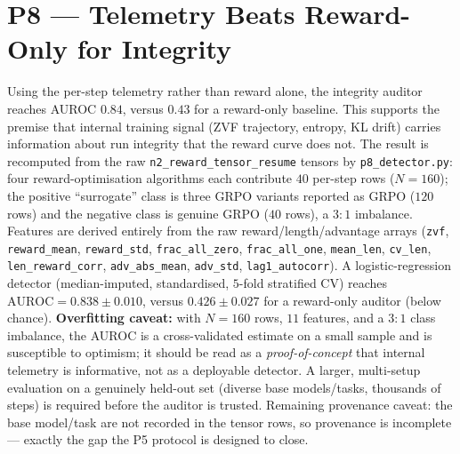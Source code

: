 \documentclass[12pt,a4paper]{report}
\begin{document}
\section{P8 --- Telemetry Beats Reward-Only for Integrity}
Using the per-step telemetry rather than reward alone, the integrity auditor reaches
AUROC $0.84$, versus $0.43$ for a reward-only baseline. This supports the premise
that internal training signal (ZVF trajectory, entropy, KL drift) carries
information about run integrity that the reward curve does not. The result is
recomputed from the raw \texttt{n2\_reward\_tensor\_resume} tensors by
\texttt{p8\_detector.py}: four reward-optimisation algorithms each contribute $40$
per-step rows ($N=160$); the positive ``surrogate'' class is three GRPO variants
reported as GRPO ($120$ rows) and the negative class is genuine GRPO ($40$ rows), a
$3{:}1$ imbalance. Features are derived entirely from the raw reward/length/advantage
arrays (\texttt{zvf}, \texttt{reward\_mean}, \texttt{reward\_std},
\texttt{frac\_all\_zero}, \texttt{frac\_all\_one}, \texttt{mean\_len},
\texttt{cv\_len}, \texttt{len\_reward\_corr}, \texttt{adv\_abs\_mean},
\texttt{adv\_std}, \texttt{lag1\_autocorr}). A logistic-regression detector
(median-imputed, standardised, $5$-fold stratified CV) reaches
$\mathrm{AUROC}=0.838\pm0.010$, versus $0.426\pm0.027$ for a reward-only auditor
(below chance). \textbf{Overfitting caveat:} with $N=160$ rows, $11$ features, and a
$3{:}1$ class imbalance, the AUROC is a cross-validated estimate on a small sample and
is susceptible to optimism; it should be read as a \emph{proof-of-concept} that
internal telemetry is informative, not as a deployable detector. A larger, multi-setup
evaluation on a genuinely held-out set (diverse base models/tasks, thousands of steps)
is required before the auditor is trusted. Remaining provenance caveat: the base
model/task are not recorded in the tensor rows, so provenance is incomplete --- exactly
the gap the P5 protocol is designed to close.
\end{document}
